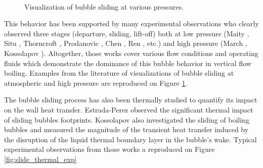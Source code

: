 \begin{figure}[H]

\begin{center}

\\

\end{center}

\caption{Visualization of bubble sliding at various pressures.}
\label{fig:slide_exp_vis}
\end{figure}


This behavior has been supported by many experimental observations who clearly observed three stages (departure, sliding, lift-off) both at low pressure (Maity \cite{maity_effect_2000}, Situ \cite{situ_bubble_2005}, Thorncroft \cite{thorncroft_experimental_1998}, Prodanovic \cite{prodanovic_bubble_2002}, Chen \cite{chen_prediction_2012}, Ren \cite{ren_development_2020}, etc.) and high pressure (March \cite{march_caracterisation_1999}, Kossolapov \cite{kossolapov_experimental_2021}). Altogether, those works cover various flow conditions and operating fluids which demonstrate the dominance of this bubble behavior in vertical flow boiling. Examples from the literature of visualizations of bubble sliding at atmospheric and high pressure are reproduced on Figure \ref{fig:slide_exp_vis}.

\npar

The bubble sliding process has also been thermally studied to quantify its impact on the wall heat transfer. Estrada-Perez \etal \cite{estrada-perez_time-resolved_2018} observed the significant thermal impact of sliding bubbles footprints. Kossolapov \cite{kossolapov_experimental_2021} also investigated the sliding of boiling bubbles and measured the magnitude of the transient heat transfer induced by the disruption of the liquid thermal boundary layer in the bubble's wake. Typical experimental observations from those works a reproduced on Figure \ref{fig:slide_thermal_exp}

